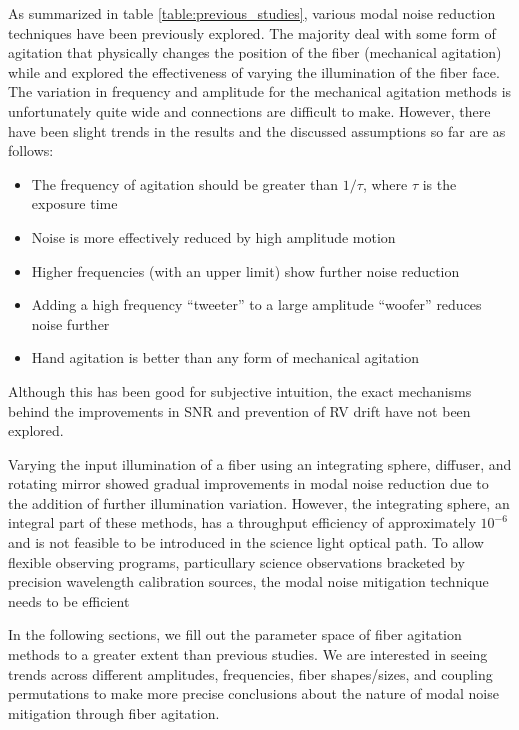 \documentclass[twocolumn]{emulateapj}
\begin{document}
As summarized in table \ref{table:previous_studies}, various modal noise reduction techniques have been previously explored. The majority deal with some form of agitation that physically changes the position of the fiber (mechanical agitation) while \citet{Mahadevan2014} and \citet{Halverson2014} explored the effectiveness of varying the illumination of the fiber face. The variation in frequency and amplitude for the mechanical agitation methods is unfortunately quite wide and connections are difficult to make. However, there have been slight trends in the results and the discussed assumptions so far are as follows:
\begin{itemize}
\item The frequency of agitation should be greater than $1/\tau$, where $\tau$ is the exposure time \citep{Baudrand2001}
\item Noise is more effectively reduced by high amplitude motion \citep{Lemke2011, McCoy2012}
\item Higher frequencies (with an upper limit) show further noise reduction \citep{Lemke2011}
\item Adding a high frequency ``tweeter'' to a large amplitude ``woofer'' reduces noise further \citep{Plavchan2013}
\item Hand agitation is better than any form of mechanical agitation \citep{Lemke2011, McCoy2012, Mahadevan2014, Roy2014}
\end{itemize}
Although this has been good for subjective intuition, the exact mechanisms behind the improvements in SNR and prevention of RV drift have not been explored.

Varying the input illumination of a fiber using an integrating sphere, diffuser, and rotating mirror showed gradual improvements in modal noise reduction due to the addition of further illumination variation. However, the integrating sphere, an integral part of these methods, has a throughput efficiency of approximately $10^{-6}$ and is not feasible to be introduced in the science light optical path. To allow flexible observing programs, particullary science observations bracketed by precision wavelength calibration sources, the modal noise mitigation technique needs to be efficient

In the following sections, we fill out the parameter space of fiber agitation methods to a greater extent than previous studies. We are interested in seeing trends across different amplitudes, frequencies, fiber shapes/sizes, and coupling permutations to make more precise conclusions about the nature of modal noise mitigation through fiber agitation.
\end{document}
